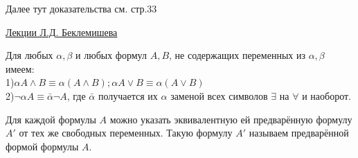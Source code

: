 Далее тут доказательства см. стр.33
\begin{center}
	\href{http://lpcs.math.msu.su/vml2019/2019_VML_Beklemishev_2_Logic.pdf}{Лекции Л.Д. Беклемишева}
\end{center}
\begin{theorem}
    Для любых $\alpha,\beta$ и любых формул $A,B$, не содержащих переменных из $\alpha,\beta$ имеем:\\
    1)$\alpha A \wedge B \equiv \alpha(A \wedge B) ; \alpha A \vee B \equiv \alpha(A \vee B)$\\
	2)$\neg \alpha A \equiv \bar{\alpha} \neg A$, где $\bar{\alpha}$ получается их $\alpha$ заменой всех символов
	$\exists$ на $\forall$ и наоборот.
\end{theorem}
\begin{theorem}
	Для каждой формулы $A$ можно указать эквивалентную ей предварённую формулу $A'$ от тех же свободных переменных.
	Такую формулу $A'$ называем предварённой формой формулы $A$.
\end{theorem}
